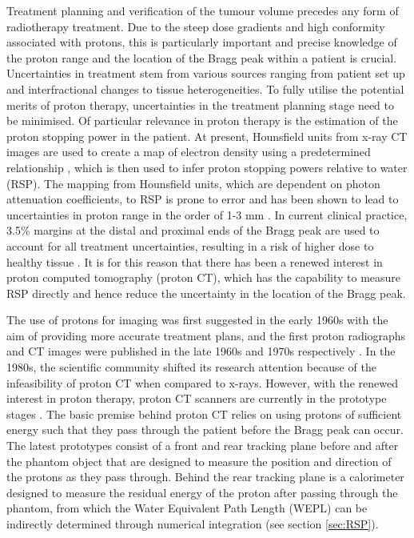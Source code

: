 \documentclass[11pt,a4paper]{article}
\begin{document}
Treatment planning and verification of the tumour volume precedes any form of radiotherapy treatment. Due to the steep dose gradients and high conformity associated with protons, this is particularly important and precise knowledge of the proton range and the location of the Bragg peak within a patient is crucial. Uncertainties in treatment stem from various sources ranging from patient set up and interfractional changes to tissue heterogeneities. To fully utilise the potential merits of proton therapy, uncertainties in the treatment planning stage need to be minimised. Of particular relevance in proton therapy is the estimation of the proton stopping power in the patient. At present, Hounsfield units from x-ray CT images are used to create a map of electron density using a predetermined relationship \parencite{schneider1996calibration}, which is then used to infer  proton stopping powers relative to water (RSP). The mapping from Hounsfield units, which are dependent on photon attenuation coefficients, to RSP is prone to error and has been shown to lead to uncertainties in proton range in the order of 1-3 mm \parencite{paganetti2012range}. In current clinical practice, 3.5\% margins at the distal and proximal ends of the Bragg peak are used to account for all treatment uncertainties, resulting in a risk of higher dose to healthy tissue \parencite{yang2012comprehensive}. It is for this reason that there has been a renewed interest in proton computed tomography (proton CT), which has the capability to measure RSP directly and hence reduce the uncertainty in the location of the Bragg peak.


The use of protons for imaging was first suggested in the early 1960s with the aim of providing more accurate treatment plans, and the first proton radiographs and CT images were published in the late 1960s and 1970s respectively \parencite{cormack1963representation,cormack1976quantitative,hanson1978application}. In the 1980s, the scientific community shifted its research attention because of the infeasibility of proton CT when compared to x-rays. However, with the renewed interest in proton therapy, proton CT scanners are currently in the prototype stages \parencite{bashkirov2016development,hurley2012phase}. The basic premise behind proton CT relies on using protons of sufficient energy such that they pass through the patient before the Bragg peak can occur. The latest prototypes consist of a front and rear tracking plane before and after the phantom object that are designed to measure the position and direction of the protons as they pass through. Behind the rear tracking plane is a calorimeter designed to measure the residual energy of the proton after passing through the phantom, from which the Water Equivalent Path Length (WEPL) can be indirectly determined through numerical integration (see section \ref{sec:RSP}).
\end{document}
